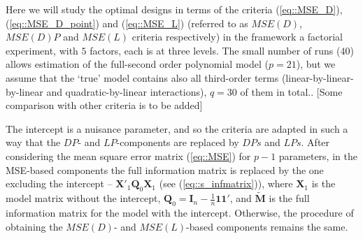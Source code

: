 
Here we will study the optimal designs in terms of the criteria (\ref{eq::MSE_D}), (\ref{eq::MSE_D_point}) and (\ref{eq::MSE_L}) (referred to as $MSE(D)$, $MSE(D)P$ and $MSE(L)$ criteria respectively) in the framework a factorial experiment, with $5$ factors, each is at three levels. The small number of runs ($40$) allows estimation of the full-second order polynomial model ($p=21$), but we assume that the `true' model contains also all third-order terms (linear-by-linear-by-linear and quadratic-by-linear interactions), $q=30$ of them in total.. 
[Some comparison with other criteria is to be added]

The intercept is a nuisance parameter, and so the criteria are adapted in such a way that the $DP$- and $LP$-components are replaced by $DPs$ and $LPs$. After considering the mean square error matrix (\ref{eq::MSE}) for $p-1$ parameters, in the MSE-based components the full information matrix is replaced by the one excluding the intercept -- $\bm{X}'_{1}\bm{Q}_0\bm{X}_{1}$ (see (\ref{eq::s_infmatrix})), where $\bm{X}_1$ is the model matrix without the intercept, $\bm{Q}_0=\bm{I}_n-\frac{1}{n}\bm{11}'$, and $\bm{\tilde{M}}$ is the full information matrix for the model with the intercept. Otherwise, the procedure of obtaining the $MSE(D)$- and $MSE(L)$-based components remains the same.

